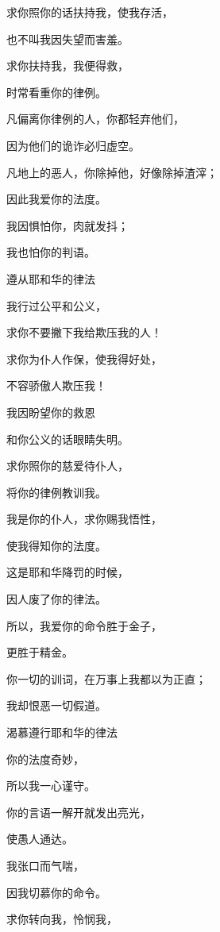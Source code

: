 {\par }{\Q {}求你照你的话扶持我，使我存活，
\par }{\Q 也不叫我因失望而害羞。
\par }{\Q {}求你扶持我，我便得救，
\par }{\Q 时常看重你的律例。
\par }{\Q {}凡偏离你律例的人，你都轻弃他们，
\par }{\Q 因为他们的诡诈必归虚空。
\par }{\Q {}凡地上的恶人，你除掉他，好像除掉渣滓；
\par }{\Q 因此我爱你的法度。
\par }{\Q {}我因惧怕你，肉就发抖；
\par }{\Q 我也怕你的判语。
\par }{\SH 遵从耶和华的律法
\par }{\Q {}我行过公平和公义，
\par }{\Q 求你不要撇下我给欺压我的人！
\par }{\Q {}求你为仆人作保，使我得好处，
\par }{\Q 不容骄傲人欺压我！
\par }{\Q {}我因盼望你的救恩
\par }{\Q 和你公义的话眼睛失明。
\par }{\Q {}求你照你的慈爱待仆人，
\par }{\Q 将你的律例教训我。
\par }{\Q {}我是你的仆人，求你赐我悟性，
\par }{\Q 使我得知你的法度。
\par }{\Q {}这是耶和华降罚的时候，
\par }{\Q 因人废了你的律法。
\par }{\Q {}所以，我爱你的命令胜于金子，
\par }{\Q 更胜于精金。
\par }{\Q {}你一切的训词，在万事上我都以为正直；
\par }{\Q 我却恨恶一切假道。
\par }{\SH 渴慕遵行耶和华的律法
\par }{\Q {}你的法度奇妙，
\par }{\Q 所以我一心谨守。
\par }{\Q {}你的言语一解开就发出亮光，
\par }{\Q 使愚人通达。
\par }{\Q {}我张口而气喘，
\par }{\Q 因我切慕你的命令。
\par }{\Q {}求你转向我，怜悯我，
}
